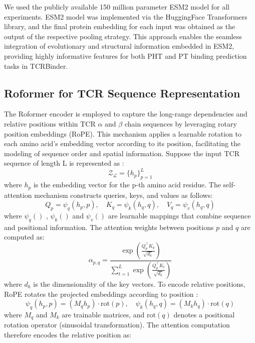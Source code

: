 \documentclass[10pt,letterpaper]{article}
\begin{document}
We used the publicly available 150 million parameter ESM2 model for all experiments. ESM2 model was implemented via the HuggingFace Transformers library, and the final protein embedding for each input was obtained as the output of the respective pooling strategy. This approach enables the seamless integration of evolutionary and structural information embedded in ESM2, providing highly informative features for both PHT and PT binding prediction tasks in TCRBinder.

\subsection*{Roformer for TCR Sequence Representation}
The Roformer encoder is employed to capture the long-range dependencies and relative positions within TCR $\alpha$ and $\beta$ chain sequences by leveraging rotary position embeddings (RoPE). This mechanism applies a learnable rotation to each amino acid’s embedding vector according to its position, facilitating the modeling of sequence order and spatial information.
Suppose the input TCR sequence of length L is represented as :
\begin{equation}
\mathcal{Z}_{\mathcal{L}} = \{ h_p \}_{p=1}^{L}
\end{equation}
where $h_p$ is the embedding vector for the p-th amino acid residue.
The self-attention mechanism constructs queries, keys, and values as follows:
\begin{equation}
Q_p = \psi_q(h_p, p), \quad 
K_q = \psi_k(h_q, q), \quad 
V_q = \psi_v(h_q, q)
\end{equation}
where $\psi_q()$ , $\psi_k()$ and $\psi_v()$ are learnable mappings that combine sequence and positional information.
The attention weights between positions $p$ and $q$ are computed as:
\begin{equation}
\alpha_{p,q} = 
\frac{\exp\!\left(\frac{Q_p^\top K_q}{\sqrt{d_k}}\right)}
     {\sum_{t=1}^L \exp\!\left(\frac{Q_p^\top K_t}{\sqrt{d_k}}\right)}
\end{equation}
where $d_k$ is the dimensionality of the key vectors.
To encode relative positions, RoPE rotates the projected embeddings according to position :
\begin{equation}
\psi_q(h_p, p) = (M_q h_p) \cdot \mathrm{rot}(p), 
\quad 
\psi_k(h_q, q) = (M_k h_q) \cdot \mathrm{rot}(q)
\end{equation}
where $M_q$ and $M_k$ are trainable matrices, and $\mathrm{rot}(q)$ denotes a positional rotation operator (sinusoidal transformation).
The attention computation therefore encodes the relative position as:
\end{document}
